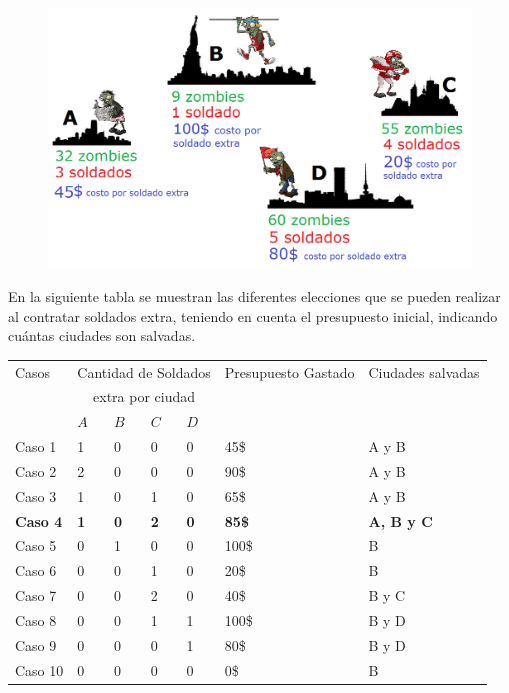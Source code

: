  \begin{figure}[h!]
   \begin{center}
 	\includegraphics[scale=0.6]{imagenes/ej1/ciudades.png}
   \end{center}
 \end{figure} 

\newpage
 En la siguiente tabla se muestran las diferentes elecciones que se pueden realizar al contratar soldados extra, teniendo en cuenta el presupuesto inicial, indicando cu\'antas ciudades son salvadas.

\begin{table}[htb]
\centering
\begin{tabular}[c]{|l|l|l|l|l|l|l|}

		\hline
		Casos &\multicolumn{4}{|c|}{Cantidad de Soldados}& Presupuesto Gastado & Ciudades salvadas\\
		&\multicolumn{4}{|c|}{extra por ciudad}& &  \\
		\cline{2-5}
		&  $A$  &  $B$  &  $C$  &  $D$  & & \\
		\hline
		Caso 1& 1 & 0 & 0 & 0 & 45\$ & A y B \\
		\hline
	    Caso 2& 2 & 0 & 0 & 0 & 90\$ & A y B \\
		\hline
		Caso 3& 1 & 0 & 1 & 0 & 65\$ & A y B \\
		\hline
		\textbf{Caso 4}& \textbf{1} &\textbf{ 0} & \textbf{2} & \textbf{0} & \textbf{85\$} & \textbf{A, B y C} \\
		\hline
		Caso 5& 0 & 1 & 0 & 0 & 100\$ & B \\
		\hline		
		Caso 6& 0 & 0 & 1 & 0 & 20\$ & B \\
		\hline
		Caso 7& 0 & 0 & 2 & 0 & 40\$ & B y C \\
		\hline
		Caso 8& 0 & 0 & 1 & 1 & 100\$ & B y D \\
		\hline
		Caso 9& 0 & 0 & 0 & 1 & 80\$ & B y D \\
		\hline
		Caso 10& 0 & 0 & 0 & 0 & 0\$ & B \\
		\hline
		
	\end{tabular}
\end{table}

